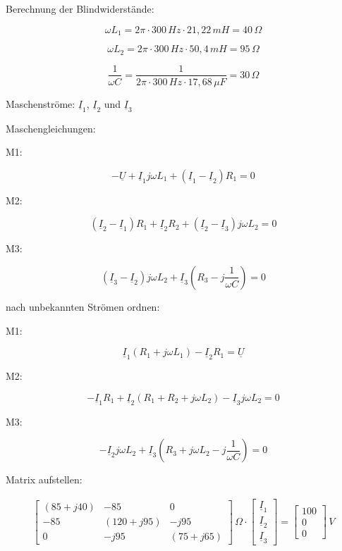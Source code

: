 \documentclass[
  ngerman,
  letterpaper,
]{scrbook}
\begin{document}
\begin{tcolorbox}[enhanced jigsaw, titlerule=0mm, rightrule=.15mm, toprule=.15mm, colback=white, toptitle=1mm, bottomrule=.15mm, coltitle=black, leftrule=.75mm, arc=.35mm, colbacktitle=quarto-callout-caution-color!10!white, opacityback=0, bottomtitle=1mm, colframe=quarto-callout-caution-color-frame, opacitybacktitle=0.6, breakable, title=\textcolor{quarto-callout-caution-color}{\faFire}\hspace{0.5em}{Lösung 7.6}, left=2mm]

Berechnung der Blindwiderstände:

\[\omega L_1 = 2\pi \cdot 300\,Hz \cdot 21,22\,mH = 40\,\Omega\]

\[\omega L_2 = 2\pi \cdot 300\,Hz \cdot 50,4\,mH = 95\,\Omega\]

\[\frac{1}{\omega C} = \frac{1}{2\pi \cdot 300\,Hz \cdot 17,68\, \mu F} = 30 \,\Omega\]

Maschenströme: \(\underline{I}_1\), \(\underline{I}_2\) und
\(\underline{I}_3\)

Maschengleichungen:

M1:

\[-\underline{U} + \underline{I}_1 j\omega L_1 + (\underline{I}_1 - \underline{I}_2)R_1 = 0\]

M2:

\[(\underline{I}_2 - \underline{I}_1)R_1 + \underline{I}_2 R_2 + (\underline{I}_2 - \underline{I}_3) j \omega L_2 = 0\]

M3:

\[(\underline{I}_3 - \underline{I}_2) j\omega L_2 + \underline{I}_3 \left( R_3 - j\frac{1}{\omega C} \right) = 0\]

nach unbekannten Strömen ordnen:

M1:

\[\underline{I}_1 (R_1 + j\omega L_1) - \underline{I}_2 R_1 = \underline{U}\]

M2:

\[-\underline{I}_1 R_1 + \underline{I}_2 (R_1 + R_2 + j\omega L_2) - \underline{I}_3 j\omega L_2 = 0\]

M3:

\[-\underline{I}_2 j\omega L_2 + \underline{I}_3 \left( R_3 + j\omega L_2 - j\frac{1}{\omega C} \right) = 0\]

Matrix aufstellen:

\begin{align}
\begin{bmatrix}
(85 + j40) & -85 & 0\\
-85 & (120 + j95) & -j95\\
0 & -j95 & (75 + j65)
\end{bmatrix} \,\Omega \cdot
\begin{bmatrix}
\underline{I}_1\\\underline{I}_2\\\underline{I}_3
\end{bmatrix} =
\begin{bmatrix}
100\\0\\0
\end{bmatrix} \,V
\end{align}

\end{tcolorbox}
\end{document}
